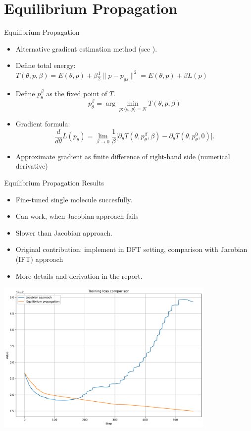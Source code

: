 \documentclass{beamer}
\begin{document}
\section{Equilibrium Propagation}
\begin{frame}{Equilibrium Propagation}
  \begin{itemize}
    \item Alternative gradient estimation method (see \cite{eqprop}).
    \item Define total energy: $T(\theta, p, \beta) = E(\theta, p) + \beta \frac{1}{2}\|p-p_{gs}\|^2 = E(\theta, p) + \beta L(p)$
    \item Define $p_{\theta}^{\beta}$ as the fixed point of $T$.
    \[
      p_{\theta}^{\beta} = \arg\min_{p:\langle w,p \rangle = N} T(\theta, p, \beta)
    \]
    \item Gradient formula:
    \[
      \frac{d}{d\theta} L(p_{\theta}) = \lim_{\beta \to 0} \frac{1}{\beta} \Big[ \partial_{\theta}T(\theta, p^{\beta}_{\theta}, \beta) - \partial_{\theta}T(\theta, p^{0}_{\theta}, 0) \Big].
    \]
    \item Approximate gradient as finite difference of right-hand side (numerical derivative)
  \end{itemize}
\end{frame}

\begin{frame}{Equilibrium Propagation Results}
  \begin{itemize}
    \item Fine-tuned single molecule succesfully.
    \item Can work, when Jacobian approach fails
    \item Slower than Jacobian approach.
    \item Original contribution: implement in DFT setting, comparison with Jacobian (IFT) approach
    \item More details and derivation in the report.
  \end{itemize}

\end{frame}

\begin{frame}

 \begin{center}
    \includegraphics[width=0.8\textwidth]{images/loss_comparison.png} %
  \end{center}
\end{frame}
\end{document}
